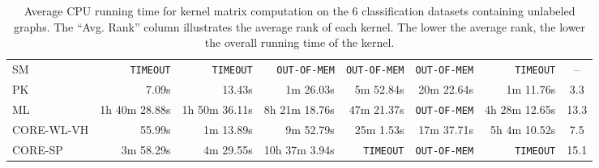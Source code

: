 \documentclass[twoside,11pt]{article}
\begin{document}
\begin{table}[t]
{\begin{tabular}{lrrrrrrc}
SM & \texttt{TIMEOUT} & \texttt{TIMEOUT} & \texttt{OUT-OF-MEM} & \texttt{OUT-OF-MEM} & \texttt{OUT-OF-MEM} & \texttt{TIMEOUT} & -- \\
PK & 7.09s & 13.43s & 1m 26.03s & 5m 52.84s & 20m 22.64s & 1m 11.76s & 3.3 \\ 
ML & 1h 40m 28.88s & 1h 50m 36.11s & 8h 21m 18.76s & 47m 21.37s & \texttt{OUT-OF-MEM} & 4h 28m 12.65s & 13.3 \\ 
CORE-WL-VH & 55.99s & 1m 13.89s & 9m 52.79s & 25m 1.53s & 17m 37.71s & 5h 4m 10.52s & 7.5 \\ 
CORE-SP & 3m 58.29s & 4m 29.55s & 10h 37m 3.94s & \texttt{TIMEOUT} & \texttt{OUT-OF-MEM} & \texttt{TIMEOUT} & 15.1 \\
\bottomrule
\end{tabular}
}
\caption{Average CPU running time for kernel matrix computation on the $6$ classification datasets containing unlabeled graphs. The ``Avg. Rank'' column illustrates the average rank of each kernel. The lower the average rank, the lower the overall running time of the kernel.}
\label{tab:runtimes_unlabeled}
\end{table}
\end{document}
